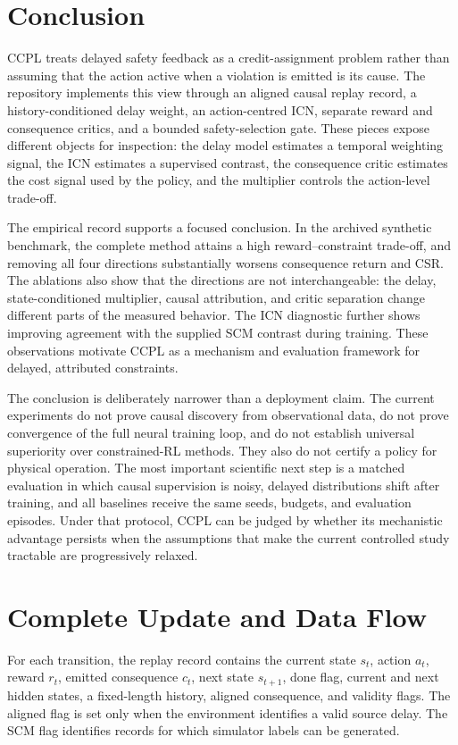 \documentclass[10pt]{article}
\begin{document}
\section{Conclusion}
CCPL treats delayed safety feedback as a credit-assignment problem rather than
assuming that the action active when a violation is emitted is its cause. The
repository implements this view through an aligned causal replay record, a
history-conditioned delay weight, an action-centred ICN, separate reward and
consequence critics, and a bounded safety-selection gate. These pieces expose
different objects for inspection: the delay model estimates a temporal
weighting signal, the ICN estimates a supervised contrast, the consequence
critic estimates the cost signal used by the policy, and the multiplier
controls the action-level trade-off.

The empirical record supports a focused conclusion. In the archived synthetic
benchmark, the complete method attains a high reward--constraint trade-off,
and removing all four directions substantially worsens consequence return and
CSR. The ablations also show that the directions are not interchangeable: the
delay, state-conditioned multiplier, causal attribution, and critic separation
change different parts of the measured behavior. The ICN diagnostic further
shows improving agreement with the supplied SCM contrast during training.
These observations motivate CCPL as a mechanism and evaluation framework for
delayed, attributed constraints.

The conclusion is deliberately narrower than a deployment claim. The current
experiments do not prove causal discovery from observational data, do not
prove convergence of the full neural training loop, and do not establish
universal superiority over constrained-RL methods. They also do not certify a
policy for physical operation. The most important scientific next step is a
matched evaluation in which causal supervision is noisy, delayed distributions
shift after training, and all baselines receive the same seeds, budgets, and
evaluation episodes. Under that protocol, CCPL can be judged by whether its
mechanistic advantage persists when the assumptions that make the current
controlled study tractable are progressively relaxed.




\appendix
\section{Complete Update and Data Flow}
For each transition, the replay record contains the current state $s_t$,
action $a_t$, reward $r_t$, emitted consequence $c_t$, next state $s_{t+1}$,
done flag, current and next hidden states, a fixed-length history, aligned
consequence, and validity flags. The aligned flag is set only when the
environment identifies a valid source delay. The SCM flag identifies records
for which simulator labels can be generated.
\end{document}
